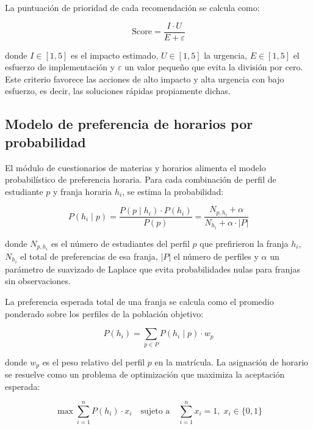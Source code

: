 La puntuación de prioridad de cada recomendación se calcula como:

\begin{equation}
\text{Score} = \frac{I \cdot U}{E + \varepsilon}
\label{eq:score}
\end{equation}

donde $I \in [1,5]$ es el impacto estimado, $U \in [1,5]$ la urgencia,
$E \in [1,5]$ el esfuerzo de implementación y $\varepsilon$ un valor pequeño
que evita la división por cero. Este criterio favorece las acciones de alto
impacto y alta urgencia con bajo esfuerzo, es decir, las soluciones rápidas
propiamente dichas.

\subsection{Modelo de preferencia de horarios por probabilidad}

El módulo de cuestionarios de materias y horarios alimenta el modelo
probabilístico de preferencia horaria. Para cada combinación de perfil de
estudiante $p$ y franja horaria $h_i$, se estima la probabilidad:

\begin{equation}
P(h_i \mid p) =
\frac{P(p \mid h_i) \cdot P(h_i)}{P(p)}
= \frac{N_{p,h_i} + \alpha}{N_{h_i} + \alpha \cdot |P|}
\label{eq:prob-horario}
\end{equation}

donde $N_{p,h_i}$ es el número de estudiantes del perfil $p$ que prefirieron la
franja $h_i$, $N_{h_i}$ el total de preferencias de esa franja, $|P|$ el número
de perfiles y $\alpha$ un parámetro de suavizado de Laplace que evita
probabilidades nulas para franjas sin observaciones.

La preferencia esperada total de una franja se calcula como el promedio
ponderado sobre los perfiles de la población objetivo:

\begin{equation}
P(h_i) = \sum_{p \in P} P(h_i \mid p) \cdot w_p
\label{eq:prob-total}
\end{equation}

donde $w_p$ es el peso relativo del perfil $p$ en la matrícula. La asignación de
horario se resuelve como un problema de optimización que maximiza la aceptación
esperada:

\begin{equation}
\max \sum_{i=1}^{n} P(h_i) \cdot x_i
\quad \text{sujeto a} \quad \sum_{i=1}^{n} x_i = 1, \; x_i \in \{0,1\}
\label{eq:optimizacion}
\end{equation}

